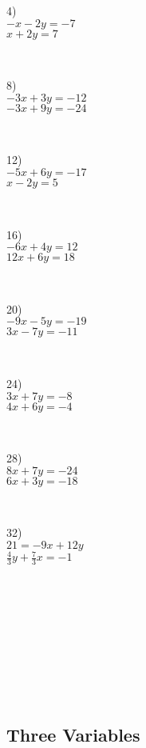 \begin{multicols}{4}
  4)\\
  $- x - 2 y = - 7$\\
  $x + 2 y = 7$\par
  ~\par
  8)\\
  $- 3 x + 3 y = - 12$\\
  $- 3 x + 9 y = - 24$\par
  ~\par
  12)\\
  $- 5 x + 6 y = - 17$\\
  $x - 2 y = 5$\par
  ~\par
  16)\\
  $- 6 x + 4 y = 12$\\
  $12 x + 6 y = 18$\par
  ~\par
  20)\\
  $- 9 x - 5 y = - 19$\\
  $3 x - 7 y = - 11$\par
  ~\par
  24)\\
  $3 x + 7 y = - 8$\\
  $4 x + 6 y = - 4$\par
  ~\par
  28)\\
  $8 x + 7 y = - 24$\\
  $6 x + 3 y = - 18$\par
  ~\par
  32)\\
  $21 = - 9 x + 12 y$\\
	$\frac{4}{3} y + \frac{7}{3} x=-1$\par
  ~\par
	~\par
	~\par
	~\par
	~\par
	
\end{multicols}

\pagebreak

\subsection{Three Variables}\par

